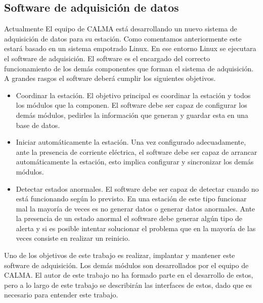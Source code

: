 	\subsection{Software de adquisición de datos}
		Actualmente El equipo de CALMA está desarrollando un nuevo sistema de adquisición de datos para su estación. Como comentamos
		anteriormente este estará basado en un sistema empotrado Linux. En ese entorno Linux se ejecutara el software de adquisición. El
		software es el encargado del correcto funcionamiento de los demás componentes que forman el sistema de adquisición. A grandes rasgos
		el software deberá cumplir los siguientes objetivos.
		\begin{itemize}
			\item 	Coordinar la estación. El objetivo principal es coordinar la estación y todos los módulos que la componen. El software
				debe ser capaz de configurar los demás módulos, pedirles la información que generan y guardar esta en una base de
				datos. 
			\item 	Iniciar automáticamente la estación. Una vez configurado adecuadamente, ante la presencia de corriente eléctrica, el
			  	software debe ser capaz de arrancar automáticamente la estación, esto implica configurar y sincronizar los demás
				módulos.
			\item 	Detectar estados anormales. El software debe ser capaz de detectar cuando no está funcionando según lo previsto. En
			  	una estación de este tipo funcionar mal la mayoría de veces es no generar datos o generar datos anormales. Ante la
				presencia de un estado anormal el software debe generar algún tipo de alerta y si es posible intentar solucionar el
				problema que en la mayoría de las veces consiste en realizar un reinicio.
		\end{itemize}
		Uno de los objetivos de este trabajo es realizar, implantar y mantener este software de adquisición. Los demás módulos son
		desarrollados por el equipo de CALMA. El autor de este trabajo no ha formado parte en el desarrollo de estos, pero a lo largo de este
		trabajo se describirán las interfaces de estos, dado que es necesario para entender este trabajo. 
